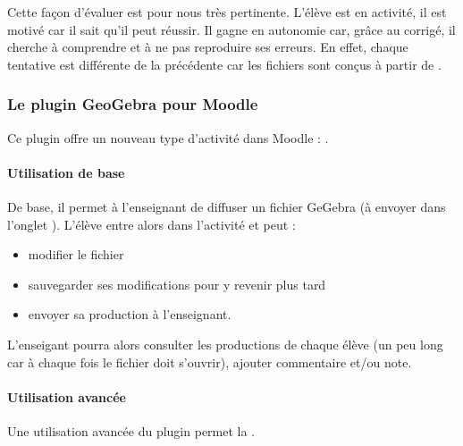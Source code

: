\documentclass[letterpaper,10pt,french]{sphinxmanual}
\begin{document}
Cette façon d’évaluer est pour nous très pertinente.
L’élève est en activité, il est motivé car il sait qu’il peut réussir.
Il gagne en autonomie car, grâce au corrigé, il cherche à comprendre et à ne pas
reproduire ses erreurs.
En effet, chaque tentative est différente de la précédente car les fichiers sont
conçus à partir de .


\subsubsection{Le plugin GeoGebra pour Moodle}
\label{\detokenize{projet-description:le-plugin-geogebra-pour-moodle}}
Ce plugin offre un nouveau type d’activité dans Moodle : .


\paragraph{Utilisation de base}
\label{\detokenize{projet-description:utilisation-de-base}}
De base, il permet à l’enseignant de diffuser un fichier GeGebra (à envoyer dans
l’onglet ).
L’élève entre alors dans l’activité et peut :
\begin{itemize}
\item {} 
modifier le fichier

\item {} 
sauvegarder ses modifications pour y revenir plus tard

\item {} 
envoyer sa production à l’enseignant.

\end{itemize}

L’enseigant pourra alors consulter les productions de chaque élève (un peu long car
à chaque fois le fichier doit s’ouvrir), ajouter commentaire et/ou note.


\paragraph{Utilisation avancée}
\label{\detokenize{projet-description:utilisation-avancee}}
Une utilisation avancée du plugin permet la .
\end{document}
